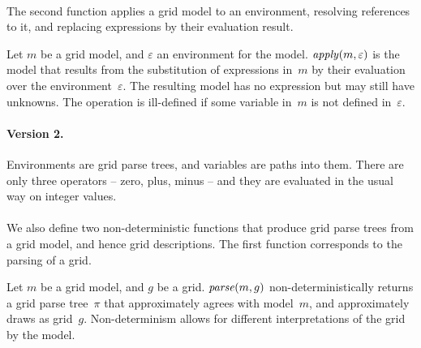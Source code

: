 \documentclass[a4paper]{llncs}
\begin{document}
\paragraph{}
The second function applies a grid model to an
environment, resolving references to it, and replacing expressions by
their evaluation result.

\begin{definition}
  Let $m$ be a grid model, and $\varepsilon$ an environment for the
  model. ${\it apply}(m,\varepsilon)$ is the model that results from
  the substitution of expressions in~$m$ by their evaluation over the
  environment~$\varepsilon$. The resulting model has no expression but
  may still have unknowns.
  The operation is ill-defined if some variable in~$m$ is not defined
  in~$\varepsilon$. 
\end{definition}

\paragraph{Version 2.} Environments are grid parse trees, and
variables are paths into them. There are only three operators -- zero, plus,
minus -- and they are evaluated in the usual way on integer values.

\paragraph{}
We also define two non-deterministic functions that produce grid parse
trees from a grid model, and hence grid descriptions. The first
function corresponds to the parsing of a grid.

\begin{definition}
  Let $m$ be a grid model, and $g$ be a grid. ${\it parse}(m,g)$
  non-deterministically returns a grid parse tree~$\pi$ that
  approximately agrees with model~$m$, and approximately draws as
  grid~$g$. Non-determinism allows for different interpretations of
  the grid by the model.
\end{definition}
\end{document}
